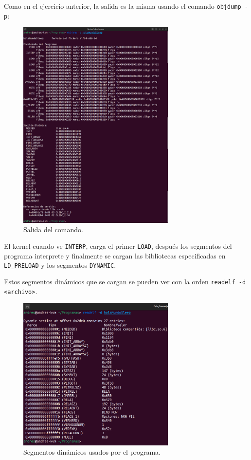 \documentclass{article}
\begin{document}
\newpage

Como en el ejercicio anterior, la salida es la misma usando el comando \verb|objdump -p|:

\begin{figure}[H]
    \centering
    \includegraphics[width=0.7\textwidth]{imagenes/objdumppsleep.png}
    \caption{Salida del comando.}
\end{figure}

El kernel cuando ve \texttt{INTERP}, carga el primer \texttt{LOAD}, después los segmentos del programa interprete y finalmente se cargan las bibliotecas especificadas en \texttt{LD\_PRELOAD} y los segmentos \texttt{DYNAMIC}. 

\newpage

Estos segmentos dinámicos que se cargan se pueden ver con la orden \verb|readelf -d <archivo>|.

\begin{figure}[H]
    \centering
    \includegraphics[width=0.7\textwidth]{imagenes/Captura desde 2022-11-17 18-47-41.png}
    \caption{Segmentos dinámicos usados por el programa.}
\end{figure}
\end{document}
